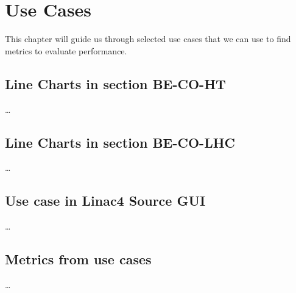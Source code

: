

\chapter{Use Cases}
\label{ch:usecases}

This chapter will guide us through selected use cases that we can use
to find metrics to evaluate performance.



\section{Line Charts in section BE-CO-HT}
\label{sec:usecases:becoht}

\dots



\section{Line Charts in section BE-CO-LHC}
\label{sec:usecases:becolhc}

\dots



\section{Use case in Linac4 Source GUI}
\label{sec:usecases:linac}

\dots



\section{Metrics from use cases}
\label{sec:usecases:metrics}

\dots